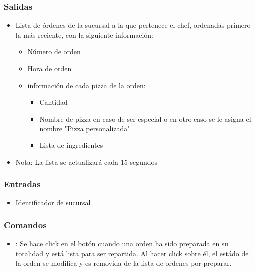 \documentclass[oneside,10pt]{book}
\begin{document}
\subsubsection{Salidas}
\begin{itemize} 
	\item Lista de órdenes de la sucursal a la que pertenece el chef, ordenadas primero la más reciente, con la siguiente información:
	\begin{itemize}
		\item Número de orden
		\item Hora de orden
		\item información de cada pizza de la orden:
		\begin{itemize}
			\item Cantidad
			\item Nombre de pizza en caso de ser especial o en otro caso se le asigna el nombre "Pizza personalizada"
			\item Lista de ingredientes
		\end{itemize}
	\end{itemize}
	\item Nota: La lista se actualizará cada 15 segundos
\end{itemize}
\subsubsection{Entradas}
\begin{itemize}
	\item Identificador de sucursal
\end{itemize}

\subsubsection{Comandos}
\begin{itemize}
	\item {}:  Se hace click en el botón cuando una orden ha sido preparada en su totalidad y está lista para ser repartida. Al hacer click sobre él, el estádo de la orden se modifica y es removida de la lista de ordenes por preparar.
\end{itemize}
\end{document}
